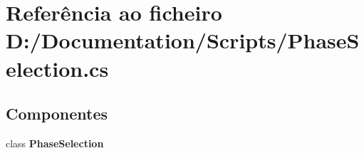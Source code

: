 \section{Referência ao ficheiro D\+:/\+Documentation/\+Scripts/\+Phase\+Selection.cs}
\label{_phase_selection_8cs}
\subsection*{Componentes}
\begin{DoxyCompactItemize}
\item 
class \textbf{ Phase\+Selection}
\end{DoxyCompactItemize}
